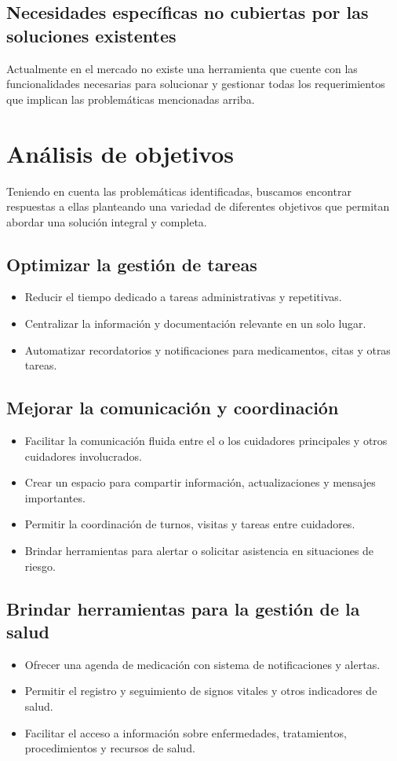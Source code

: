 \documentclass[a4paper,12pt]{article}
\begin{document}
    \subsection{Necesidades específicas no cubiertas por las soluciones existentes}
    Actualmente en el mercado no existe una herramienta que cuente con las funcionalidades necesarias para solucionar y gestionar todas los requerimientos que implican las problemáticas mencionadas arriba. 

    \newpage

    \section{Análisis de objetivos}
    Teniendo en cuenta las problemáticas identificadas, buscamos encontrar respuestas a ellas planteando una variedad de diferentes objetivos que permitan abordar una solución integral y completa.
    \subsection{Optimizar la gestión de tareas}
    \begin{itemize}
        \item Reducir el tiempo dedicado a tareas administrativas y repetitivas.
        \item Centralizar la información y documentación relevante en un solo lugar.
        \item Automatizar recordatorios y notificaciones para medicamentos, citas y otras tareas.
    \end{itemize}
    \subsection{Mejorar la comunicación y coordinación}
    \begin{itemize}
        \item Facilitar la comunicación fluida entre el o los cuidadores principales y otros cuidadores involucrados.
        \item Crear un espacio para compartir información, actualizaciones y mensajes importantes.
        \item Permitir la coordinación de turnos, visitas y tareas entre cuidadores.
        \item Brindar herramientas para alertar o solicitar asistencia en situaciones de riesgo.
    \end{itemize}
    \subsection{Brindar herramientas para la gestión de la salud}
    \begin{itemize}
        \item Ofrecer una agenda de medicación con sistema de notificaciones y alertas.
        \item Permitir el registro y seguimiento de signos vitales y otros indicadores de salud.
        \item Facilitar el acceso a información sobre enfermedades, tratamientos, procedimientos y recursos de salud.
    \end{itemize}
\end{document}
